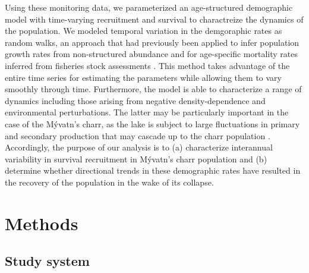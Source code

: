 \documentclass[11pt]{article}
\begin{document}
Using these monitoring data, 
we parameterized an age-structured demographic model with time-varying recruitment and survival 
to charactreize the dynamics of the population.
We modeled temporal variation in the demgoraphic rates as random walks, 
an approach that had previously been applied 
to infer population growth rates from non-structured abundance 
\citep{zeng1998}
and for age-specific mortality rates inferred from fisheries stock assessments 
\citep{nielsen2014estimation}. 
This method takes advantage of the entire time series for estimating the parameters 
while allowing them to vary smoothly through time. 
Furthermore, the model is able to characterize a range of dynamics including those
arising from negative density-dependence and environmental perturbations.
The latter may be particularly important in the case of the M\'{y}vatn's charr,
as the lake is subject to large fluctuations in primary and secondary production
that may cascade up to the charr population 
\citep{einarsson2004myvatn, einarsson2004clad, gardarsson2004population}.
Accordingly, the purpose of our analysis is to 
(a) characterize interannual variability in survival recruitment 
in M\'{y}vatn's charr population 
and (b) determine whether directional trends in these demographic rates have
resulted in the recovery of the population in the wake of its collapse. 





\section*{Methods} 

\subsection*{Study system} 
\end{document}
